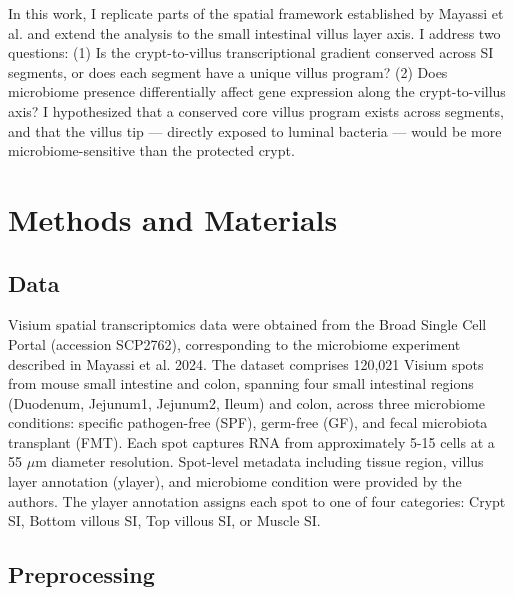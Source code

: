 \documentclass[11pt, a4paper]{article}
\begin{document}
In this work, I replicate parts of the spatial framework established 
by Mayassi et al. and extend the analysis to the small intestinal 
villus layer axis. I address two questions: (1) Is the 
crypt-to-villus transcriptional gradient conserved across SI 
segments, or does each segment have a unique villus program? 
(2) Does microbiome presence differentially affect gene expression 
along the crypt-to-villus axis? I hypothesized that a conserved 
core villus program exists across segments, and that the villus 
tip — directly exposed to luminal bacteria — would be more 
microbiome-sensitive than the protected crypt.

\section{Methods and Materials}

\subsection{Data}

Visium spatial transcriptomics data were obtained from the Broad 
Single Cell Portal (accession SCP2762), corresponding to the 
microbiome experiment described in Mayassi et al. 2024. The dataset 
comprises 120,021 Visium spots from mouse small intestine and colon, 
spanning four small intestinal regions (Duodenum, Jejunum1, Jejunum2, 
Ileum) and colon, across three microbiome conditions: specific 
pathogen-free (SPF), germ-free (GF), and fecal microbiota transplant 
(FMT). Each spot captures RNA from approximately 5-15 cells at a 
55 $\mu$m diameter resolution. Spot-level metadata including tissue 
region, villus layer annotation (ylayer), and microbiome condition 
were provided by the authors. The ylayer annotation assigns each 
spot to one of four categories: Crypt SI, Bottom villous SI, 
Top villous SI, or Muscle SI.

\subsection{Preprocessing}
\end{document}
